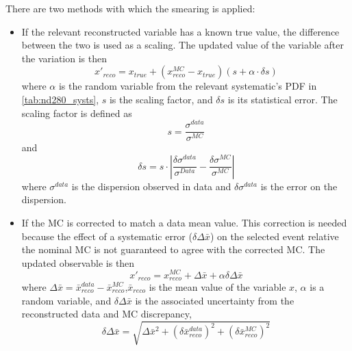 There are two methods with which the smearing is applied:
\begin{itemize}
	\item If the relevant reconstructed variable has a known true value, the difference between the two is used as a scaling. The updated value of the variable after the variation is then
	\begin{equation}
		x'_{reco} = x_{true} + \left(x_{reco}^{MC}-x_{true}\right)\left(s + \alpha \cdot \delta s\right)
	\end{equation}
	where $\alpha$ is the random variable from the relevant systematic's PDF in \autoref{tab:nd280_systs}, $s$ is the scaling factor, and $\delta s$ is its statistical error. The scaling factor is defined as
	\begin{equation}
		s = \frac{\sigma^{data}}{\sigma^{MC}}
	\end{equation}
	and
	\begin{equation}
		\delta s = s \cdot \left| \frac{\delta \sigma^{data}}{\sigma^{Data}} - \frac{\delta \sigma^{MC}}{\sigma^{MC}} \right|
	\end{equation}
	where $\sigma^{data}$ is the dispersion observed in data and $\delta \sigma^{data}$ is the error on the dispersion.
	\item If the MC is corrected to match a data mean value. This correction is needed because the effect of a systematic error ($\delta \Delta \bar{x}$) on the selected event relative the nominal MC is not guaranteed to agree with the corrected MC. The updated observable is then
	\begin{equation}
		x'_{reco} = x^{MC}_{reco}+ \Delta\bar{x} + \alpha \delta \Delta \bar{x}
	\end{equation}
	where $\Delta\bar{x} = \bar{x}^{data}_{reco}-\bar{x}^{MC}_{reco}$,$\bar{x}_{reco}$ is the mean value of the variable $x$, $\alpha$ is a random variable, and $\delta \Delta \bar{x}$ is the associated uncertainty from the reconstructed data and MC discrepancy,
	\begin{equation}
		\delta \Delta \bar{x} = \sqrt{\Delta\bar{x}^2 + \left(\delta \bar{x}^{data}_{reco}\right)^2  + \left(\delta \bar{x}^{MC}_{reco}\right)^2}
	\end{equation}
\end{itemize}

